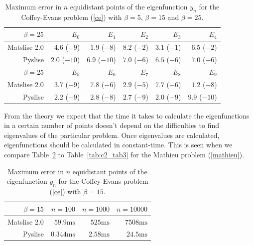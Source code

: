 \begin{table}
    \begin{center}
        \begin{tabular}{rrrrrr}
            \toprule
            $\beta=25$   & $E_{0}$       & $E_{1}$       & $E_{2}$      & $E_{3}$      & $E_{4}$       \\
            \midrule
            Matslise 2.0 & $4.6$ ($-9$)  & $1.9$ ($-8$)  & $8.2$ ($-2$) & $3.1$ ($-1$) & $6.5$ ($-2$)  \\
            Pyslise      & $2.0$ ($-10$) & $6.9$ ($-10$) & $7.0$ ($-6$) & $6.5$ ($-6$) & $7.0$ ($-6$)  \\
            \midrule
            \midrule
            $\beta=25$   & $E_{5}$       & $E_{6}$       & $E_{7}$      & $E_{8}$      & $E_{9}$       \\
            \midrule
            Matslise 2.0 & $3.7$ ($-9$)  & $7.8$ ($-6$)  & $2.9$ ($-5$) & $7.7$ ($-6$) & $1.2$ ($-8$)  \\
            Pyslise      & $2.2$ ($-9$)  & $2.8$ ($-8$)  & $2.7$ ($-9$) & $2.0$ ($-9$) & $9.9$ ($-10$) \\
            \bottomrule
        \end{tabular}
    \end{center}
    \caption{\label{tab:c2_tab5} Maximum error in $n$ equidistant points of the eigenfunction $y_n$ for the Coffey-Evans problem (\ref{ce}) with $\beta=5$, $\beta=15$ and $\beta=25$.}
\end{table}

From the theory we expect that the time it takes to calculate the eigenfunctions in a certain number of points doesn't depend on the difficulties to find eigenvalues of the particular problem. Once eigenvalues are calculated, eigenfunctions should be calculated in constant-time. This is seen when we compare Table~\ref{tab:c2_tab6} to Table~\ref{tab:c2_tab3} for the Mathieu problem (\ref{mathieu}).

\begin{table}
    \begin{center}
        \begin{tabular}{rrrr}
            \toprule
            $\beta = 15$ & $n=100$          & $n=1000$        & $n=10000$       \\
            \midrule
            Matslise 2.0 & $59.9\text{ms}$  & $525\text{ms}$  & $7508\text{ms}$ \\
            Pyslise      & $0.344\text{ms}$ & $2.58\text{ms}$ & $24.5\text{ms}$ \\
            \bottomrule
        \end{tabular}
    \end{center}
    \caption{\label{tab:c2_tab6} Maximum error in $n$ equidistant points of the eigenfunction $y_n$ for the Coffey-Evans problem (\ref{ce}) with $\beta=15$.}
\end{table}

